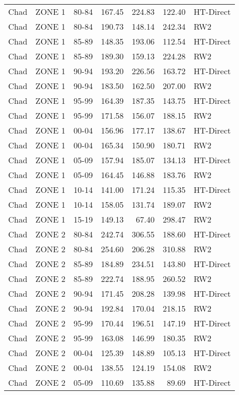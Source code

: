 \begin{longtable}{lllrrrl}
  Chad & ZONE 1 & 80-84 & 167.45 & 224.83 & 122.40 & HT-Direct \\ 
  Chad & ZONE 1 & 80-84 & 190.73 & 148.14 & 242.34 & RW2 \\ 
  Chad & ZONE 1 & 85-89 & 148.35 & 193.06 & 112.54 & HT-Direct \\ 
  Chad & ZONE 1 & 85-89 & 189.30 & 159.13 & 224.28 & RW2 \\ 
  Chad & ZONE 1 & 90-94 & 193.20 & 226.56 & 163.72 & HT-Direct \\ 
  Chad & ZONE 1 & 90-94 & 183.50 & 162.50 & 207.00 & RW2 \\ 
  Chad & ZONE 1 & 95-99 & 164.39 & 187.35 & 143.75 & HT-Direct \\ 
  Chad & ZONE 1 & 95-99 & 171.58 & 156.07 & 188.15 & RW2 \\ 
  Chad & ZONE 1 & 00-04 & 156.96 & 177.17 & 138.67 & HT-Direct \\ 
  Chad & ZONE 1 & 00-04 & 165.34 & 150.90 & 180.71 & RW2 \\ 
  Chad & ZONE 1 & 05-09 & 157.94 & 185.07 & 134.13 & HT-Direct \\ 
  Chad & ZONE 1 & 05-09 & 164.45 & 146.88 & 183.76 & RW2 \\ 
  Chad & ZONE 1 & 10-14 & 141.00 & 171.24 & 115.35 & HT-Direct \\ 
  Chad & ZONE 1 & 10-14 & 158.05 & 131.74 & 189.07 & RW2 \\ 
  Chad & ZONE 1 & 15-19 & 149.13 & 67.40 & 298.47 & RW2 \\ 
  Chad & ZONE 2 & 80-84 & 242.74 & 306.55 & 188.60 & HT-Direct \\ 
  Chad & ZONE 2 & 80-84 & 254.60 & 206.28 & 310.88 & RW2 \\ 
  Chad & ZONE 2 & 85-89 & 184.89 & 234.51 & 143.80 & HT-Direct \\ 
  Chad & ZONE 2 & 85-89 & 222.74 & 188.95 & 260.52 & RW2 \\ 
  Chad & ZONE 2 & 90-94 & 171.45 & 208.28 & 139.98 & HT-Direct \\ 
  Chad & ZONE 2 & 90-94 & 192.84 & 170.04 & 218.15 & RW2 \\ 
  Chad & ZONE 2 & 95-99 & 170.44 & 196.51 & 147.19 & HT-Direct \\ 
  Chad & ZONE 2 & 95-99 & 163.08 & 146.99 & 180.35 & RW2 \\ 
  Chad & ZONE 2 & 00-04 & 125.39 & 148.89 & 105.13 & HT-Direct \\ 
  Chad & ZONE 2 & 00-04 & 138.55 & 124.19 & 154.08 & RW2 \\ 
  Chad & ZONE 2 & 05-09 & 110.69 & 135.88 & 89.69 & HT-Direct \\ 

\end{longtable}
